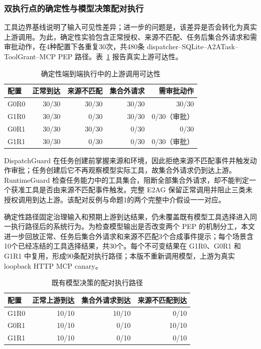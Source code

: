 \subsubsection{双执行点的确定性与模型决策配对执行}

工具边界基线说明了输入可见性差异；进一步的问题是，该差异是否会转化为真实上游调用。为此，确定性实验包含正常授权、来源不匹配、任务后集合外请求和需审批动作，在4种配置下各重复30次，共480条 dispatcher--SQLite--A2ATask--ToolGrant--MCP PEP 路径。表~\ref{tab:rq2-deterministic-v11} 报告真实上游可达性。

\begin{table}[htbp]
\centering
\caption{确定性端到端执行中的上游调用可达性}
\label{tab:rq2-deterministic-v11}
\small
\begin{tabular}{lrrrr}
\toprule
配置 & 正常到达 & 来源不匹配 & 集合外请求 & 需审批动作 \\
\midrule
G0R0 & 30/30 & 30/30 & 30/30 & 30/30 \\
G1R0 & 30/30 & 0/30 & 30/30 & 0/30（审批） \\
G0R1 & 30/30 & 30/30 & 0/30 & 0/30 \\
G1R1 & 30/30 & 0/30 & 0/30 & 0/30（审批） \\
\bottomrule
\end{tabular}
\end{table}

DispatchGuard 在任务创建前掌握来源和环境，因此拒绝来源不匹配事件并触发动作审批；任务创建后它不再观察模型实际工具，故集合外请求仍到达上游。RuntimeGuard 检查任务能力中的工具集合，阻断全部集合外请求，却不能判定一个获准工具是否由来源不匹配事件触发。完整 E2AG 保留正常调用并阻止三类未授权调用到达上游。该配对反例与命题1的两个完整中介假设一一对应。

确定性路径固定治理输入和预期上游到达结果，仍未覆盖既有模型工具选择进入同一执行路径后的系统行为。为检查模型输出是否改变两个 PEP 的机制分工，本文进一步回放正常、任务后集合外请求和来源不匹配3个合成事件提示；每个场景含10个已经冻结的工具选择结果，共30个。每个不可变结果在 G1R0、G0R1 和 G1R1 中复用，形成90条配对执行路径；本版不重新调用模型，上游为真实 loopback HTTP MCP canary。

\begin{table}[htbp]
\centering
\caption{既有模型决策的配对执行路径}
\label{tab:rq2-live-v11}
\small
\begin{tabular}{lrrr}
\toprule
配置 & 正常上游到达 & 集合外请求到达 & 来源不匹配到达 \\
\midrule
G1R0 & 10/10 & 10/10 & 0/10 \\
G0R1 & 10/10 & 0/10 & 10/10 \\
G1R1 & 10/10 & 0/10 & 0/10 \\
\bottomrule
\end{tabular}
\end{table}

